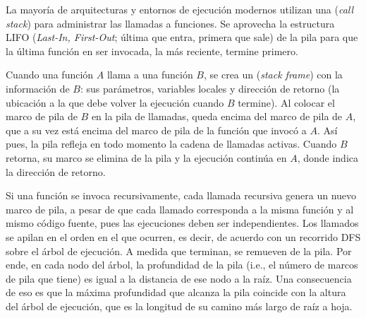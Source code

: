 La mayoría de arquitecturas y entornos de ejecución modernos utilizan una  (\textit{call stack}) para administrar las llamadas a funciones. Se aprovecha la estructura LIFO (\textit{Last-In, First-Out}; última que entra, primera que sale) de la pila para que la última función en ser invocada, la más reciente, termine primero.

Cuando una función \(A\) llama a una función \(B\), se crea un  (\textit{stack frame}) con la información de \(B\): sus parámetros, variables locales y dirección de retorno (la ubicación a la que debe volver la ejecución cuando \(B\) termine). Al colocar el marco de pila de \(B\) en la pila de llamadas, queda encima del marco de pila de \(A\), que a su vez está encima del marco de pila de la función que invocó a \(A\). Así pues, la pila refleja en todo momento la cadena de llamadas activas. Cuando \(B\) retorna, su marco se elimina de la pila y la ejecución continúa en \(A\), donde indica la dirección de retorno.

Si una función se invoca recursivamente, cada llamada recursiva genera un nuevo marco de pila, a pesar de que cada llamado corresponda a la misma función y al mismo código fuente, pues las ejecuciones deben ser independientes. Los llamados se apilan en el orden en el que ocurren, es decir, de acuerdo con un recorrido DFS sobre el árbol de ejecución. A medida que terminan, se remueven de la pila. Por ende, en cada nodo del árbol, la profundidad de la pila (i.e., el número de marcos de pila que tiene) es igual a la distancia de ese nodo a la raíz. Una consecuencia de eso es que la máxima profundidad que alcanza la pila coincide con la altura del árbol de ejecución, que es la longitud de su camino más largo de raíz a hoja.
